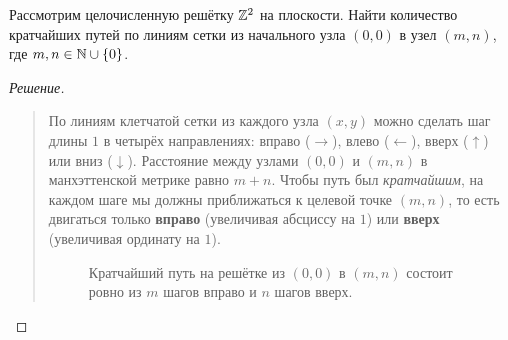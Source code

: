\begin{problem}
    Рассмотрим целочисленную решётку $\mathbb{Z}^2$ на плоскости. Найти количество 
    кратчайших путей по линиям сетки из начального узла $(0, 0)$ в узел 
    $(m, n)$, где $m, n \in \mathbb{N} \cup \{0\}$.
\end{problem}

\begin{proof}[Решение]~\\
    \begin{quote}
        По линиям клетчатой сетки из каждого узла $(x, y)$ можно сделать 
        шаг длины $1$ в четырёх направлениях: вправо ($\to$), влево ($\leftarrow$), 
        вверх ($\uparrow$) или вниз ($\downarrow$). Расстояние между 
        узлами $(0, 0)$ и $(m, n)$ в манхэттенской метрике равно $m + n$. 
        Чтобы путь был \emph{кратчайшим}, на каждом шаге мы должны 
        приближаться к целевой точке $(m, n)$, то есть двигаться только 
        \textbf{вправо} (увеличивая абсциссу на $1$) или \textbf{вверх} 
        (увеличивая ординату на $1$).

        \begin{figure}[H]
            \centering
            \caption{Кратчайший путь на решётке из $(0, 0)$ в $(m, n)$ 
            состоит ровно из $m$ шагов вправо и $n$ шагов вверх.}
        \end{figure}


\end{quote}
\end{proof}
